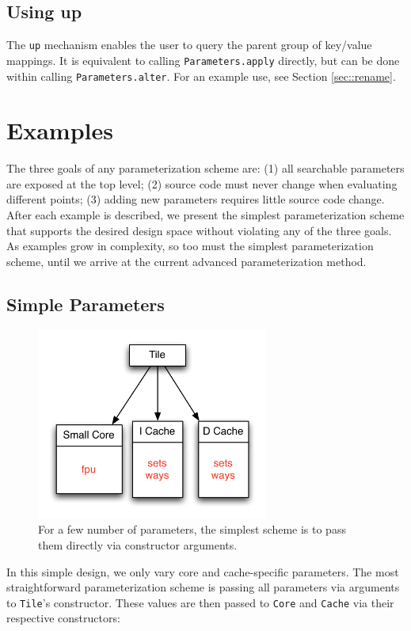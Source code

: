 \documentclass[10pt,twocolumn]{article}
\def\code#1{{\small\tt #1}}
\begin{document}
\subsection{Using up}
\label{sec::up}

The \code{up} mechanism enables the user to query the parent group of key/value mappings. It is equivalent to calling \code{Parameters.apply} directly, but can be done within calling \code{Parameters.alter}. For an example use, see Section \ref{sec::rename}.

\section{Examples}
\label{sec:examples}

The three goals of any parameterization scheme are: (1) all searchable parameters are exposed at the top level; (2) source code must never change when evaluating different points; (3) adding new parameters requires little source code change. After each example is described, we present the simplest parameterization scheme that supports the desired design space without violating any of the three goals. As examples grow in complexity, so too must the simplest parameterization scheme, until we arrive at the current advanced parameterization method.

\subsection{Simple Parameters}

\begin{figure}[h]
\centering
\includegraphics[width=3in]{figs/ex1.pdf}
\caption{For a few number of parameters, the simplest scheme is to pass them directly via constructor arguments.}
\label{fig:ex1}
\end{figure}

In this simple design, we only vary core and cache-specific parameters. The most straightforward parameterization scheme is passing all parameters via arguments to \code{Tile}'s constructor. These values are then passed to \code{Core} and \code{Cache} via their respective constructors: 
\end{document}
